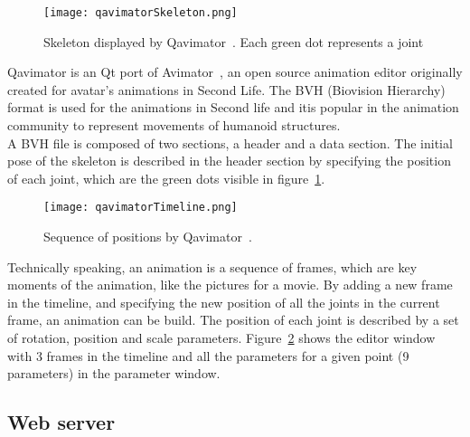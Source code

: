 \begin{figure}[h]
  \caption{Skeleton displayed by Qavimator~\cite{qavimatorWebsite}. Each green dot represents a joint}
  \centering
  \texttt{[image: qavimatorSkeleton.png]}
  \label{qavimatorSkeleton}
\end{figure}

Qavimator is an Qt port of Avimator~\cite{avimatorWebsite}, an open source animation editor originally created for avatar's animations in Second Life. The BVH (Biovision Hierarchy)~\cite{thingvold1999biovision} format is used for the animations in Second life and itis popular in the animation community to represent movements of humanoid structures. \\

A BVH file is composed of two sections, a header and a data section. The initial pose of the skeleton is described in the header section by specifying the position of each joint, which are the green dots visible in figure~\ref{qavimatorSkeleton}. \\

\begin{figure}[h]
  \caption{Sequence of positions by Qavimator~\cite{qavimatorWebsite}. }
  \centering
  \texttt{[image: qavimatorTimeline.png]}
  \label{qavimatorTimeline}
\end{figure}

Technically speaking, an animation is a sequence of frames, which are key moments of the animation, like the pictures for a movie.
By adding a new frame in the timeline, and specifying the new position of all the joints in the current frame, an animation can be build. The position of each joint is described by a set of rotation, position and scale parameters. Figure~\ref{qavimatorTimeline} shows the editor window with 3 frames in the timeline and all the parameters for a given point (9 parameters) in the parameter window.


\subsection{Web server}
